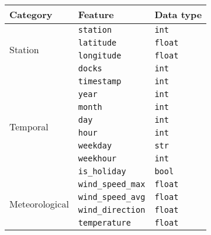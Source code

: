 \documentclass[11pt]{extarticle}
\begin{document}
\begin{figure}
  \centering
  \begin{tabular}{lll}
    Category                               & Feature                              & Data type
    \\
    \hline \multirow{4}{*}{Station}        & \texttt{station}                     &
    \texttt{int}
    \\
                                           & \texttt{latitude}                    & \texttt{float}
    \\
                                           & \texttt{longitude}                   &
    \texttt{float}
    \\
                                           & \texttt{docks}                       & \texttt{int}
    \\
    \hline \multirow{8}{*}{Temporal}       &
    \texttt{timestamp}                     & \texttt{int}
    \\
                                           & \texttt{year}                        & \texttt{int}
    \\
                                           & \texttt{month}
                                           & \texttt{int}
    \\
                                           & \texttt{day}                         & \texttt{int}
    \\
                                           & \texttt{hour}                        & \texttt{int}
    \\
                                           &
    \texttt{weekday}                       & \texttt{str}
    \\
                                           & \texttt{weekhour}                    & \texttt{int}
    \\
                                           &
    \texttt{is\_holiday}                   & \texttt{bool}
    \\
    \hline \multirow{7}{*}{Meteorological} &
    \texttt{wind\_speed\_max}              & \texttt{float}
    \\
                                           & \texttt{wind\_speed\_avg}            &
    \texttt{float}
    \\
                                           & \texttt{wind\_direction}             & \texttt{float}
    \\
                                           & \texttt{temperature}
                                           & \texttt{float}

\end{tabular}
\end{figure}
\end{document}
